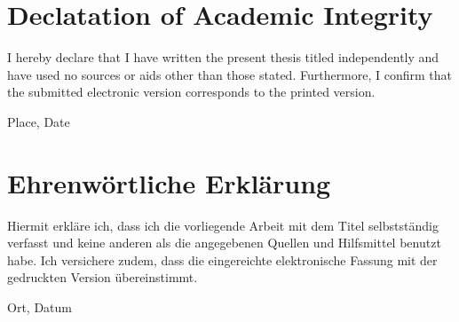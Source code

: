 \clearpage
\chapter*{Declatation of Academic Integrity}

I hereby declare that I have written the present thesis titled \textit{\DerTitelDerArbeit} independently 
and have used no sources or aids other than those stated. Furthermore, I confirm that 
the submitted electronic version corresponds to the printed version.

\vspace{3cm}
Place, Date \hfill \DerAutorDerArbeit


\chapter*{Ehrenwörtliche Erklärung}

Hiermit erkläre ich, dass ich die vorliegende Arbeit mit dem Titel \textit{\DerTitelDerArbeit} 
selbstständig verfasst und keine anderen als die angegebenen Quellen und Hilfsmittel benutzt habe. 
Ich versichere zudem, dass die eingereichte elektronische Fassung mit der gedruckten Version übereinstimmt.

\vspace{3cm}
Ort, Datum \hfill \DerAutorDerArbeit